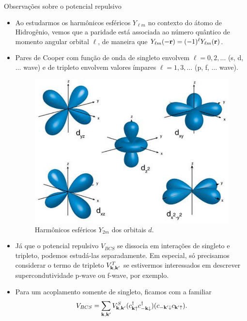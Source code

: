 \documentclass[8pt,aspectratio=169,xcolor={table,dvipsnames,usenames}]{beamer}
\begin{document}


\begin{frame}{Observações sobre o potencial repulsivo}

\begin{itemize}
\item Ao estudarmos os harmônicos esféricos $Y_{\ell m}$ no contexto do átomo de Hidrogênio, vemos que a paridade está associada ao número quântico de momento angular orbital $\ell$, de maneira que $Y_{\ell m}(-\vb{r}) = (-1)^\ell Y_{\ell m}(\vb{r})$.

\n

\item Pares de Cooper com função de onda de singleto envolvem $\ell = 0, 2, \ldots$ (s, d, $\ldots$ wave) e de tripleto envolvem valores ímpares $\ell = 1, 3, \ldots$ (p, f, $\ldots$ wave).

\begin{figure}[H]
\centering
\includegraphics[width=0.27\linewidth]{fig/d-orbitals.png}
\caption{Harmônicos esféricos $Y_{2m}$ dos orbitais $d$.}
\label{fig:d-orbitals}
\end{figure}

\item Já que o potencial repulsivo $V_{BCS}$ se dissocia em interações de singleto e tripleto, podemos estudá-las separadamente. Em especial, só precisamos considerar o termo de tripleto $V^T_{\vb{k},\vb{k}'}$ se estivermos interessados em descrever supercondutividade p-wave ou f-wave, por exemplo.

\n

\item Para um acoplamento somente de singleto, ficamos com a familiar
$$
V_{BCS} = \sum_{\vb{k},\vb{k}'} V_{\vb{k},\vb{k}'}^S (c_{\vb{k}\uparrow}^\dagger c_{-\vb{k}\downarrow}^\dagger) (c_{-\vb{k}'\downarrow} c_{\vb{k}'\uparrow}).
$$
\end{itemize}

\end{frame}


\end{document}
